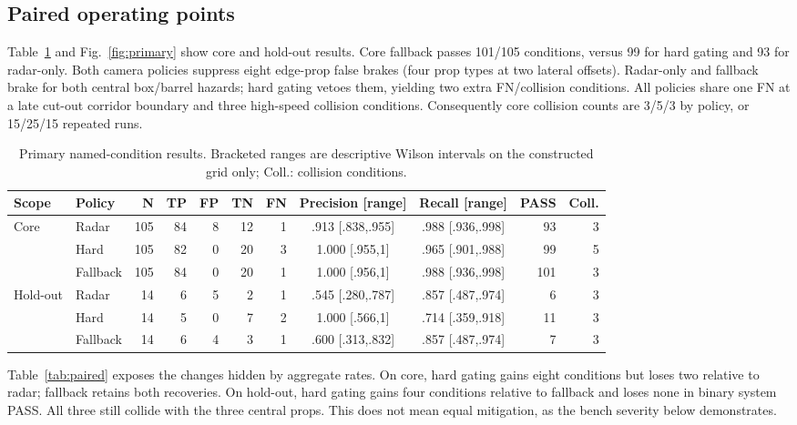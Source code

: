 \documentclass[conference]{IEEEtran}
\begin{document}
\subsection{Paired operating points}
Table~\ref{tab:primary} and Fig.~\ref{fig:primary} show core and hold-out results.
Core fallback passes 101/105 conditions, versus 99 for hard gating and 93 for
radar-only. Both camera policies suppress eight edge-prop false brakes (four
prop types at two lateral offsets). Radar-only and fallback brake for both
central box/barrel hazards; hard gating vetoes them, yielding two extra
FN/collision conditions. All policies share one FN at a late cut-out corridor
boundary and three high-speed collision conditions. Consequently core collision
counts are 3/5/3 by policy, or 15/25/15 repeated runs.

\begin{table}[t]
\caption{Primary named-condition results. Bracketed ranges are descriptive Wilson intervals on the constructed grid only; Coll.: collision conditions.}
\label{tab:primary}
\centering\scriptsize
\setlength{\tabcolsep}{3pt}
\begin{tabular}{llrrrrrccrr}
\toprule Scope & Policy & N & TP & FP & TN & FN & Precision [range] & Recall [range] & PASS & Coll.\\
\midrule
Core & Radar & 105 & 84 & 8 & 12 & 1 & .913 [.838,.955] & .988 [.936,.998] & 93 & 3\\
 & Hard & 105 & 82 & 0 & 20 & 3 & 1.000 [.955,1] & .965 [.901,.988] & 99 & 5\\
 & Fallback & 105 & 84 & 0 & 20 & 1 & 1.000 [.956,1] & .988 [.936,.998] & 101 & 3\\
\midrule
Hold-out & Radar & 14 & 6 & 5 & 2 & 1 & .545 [.280,.787] & .857 [.487,.974] & 6 & 3\\
 & Hard & 14 & 5 & 0 & 7 & 2 & 1.000 [.566,1] & .714 [.359,.918] & 11 & 3\\
 & Fallback & 14 & 6 & 4 & 3 & 1 & .600 [.313,.832] & .857 [.487,.974] & 7 & 3\\
\bottomrule
\end{tabular}
\end{table}

Table~\ref{tab:paired} exposes the changes hidden by aggregate rates. On core,
hard gating gains eight conditions but loses two relative to radar; fallback
retains both recoveries. On hold-out, hard gating gains four conditions relative
to fallback and loses none in binary system PASS. All three still collide with
the three central props. This does not mean equal mitigation, as the bench
severity below demonstrates.
\end{document}
